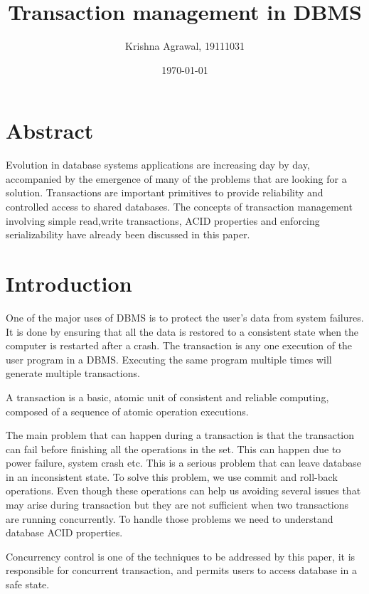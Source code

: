 \documentclass{article}
\title{Transaction management in DBMS}
\author{Krishna Agrawal, 19111031}
\date{\today}
\begin{document}
\maketitle

\section*{Abstract}

Evolution in database systems applications are increasing day by day, 
accompanied by the emergence of many of the problems that are looking for a 
solution. Transactions are important primitives to provide reliability and controlled access to shared databases. The concepts of transaction management involving simple read,write transactions, ACID properties and enforcing serializability have already been discussed in this paper.


\section*{Introduction}

One of the major uses of DBMS is to protect the user’s data from system failures. It is done by ensuring that all the data is restored to a consistent state when the computer is restarted after a crash. The transaction is any one execution of the user program in a DBMS. Executing the same program multiple times will generate multiple transactions.

A transaction is a basic, atomic unit of consistent and reliable computing, composed of a sequence of atomic operation executions. 

The main problem that can happen during a transaction is that the transaction can fail before finishing all the operations in the set. This can happen due to power failure, system crash etc. This is a serious problem that can leave database in an inconsistent state. To solve this problem, we use commit and roll-back operations. Even though these operations can help us avoiding several issues that may arise during transaction but they are not sufficient when two transactions are running concurrently. To handle those problems we need to understand database ACID properties. 

Concurrency control is one of the techniques to be addressed by this 
paper, it is responsible for concurrent transaction, and permits users to access database in a safe state. 
\end{document}
